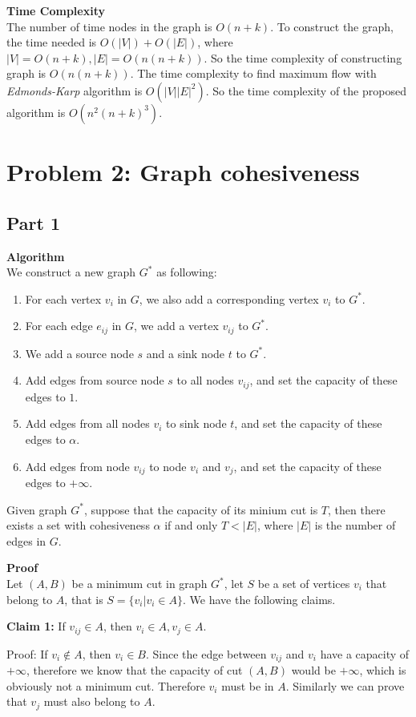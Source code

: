 \documentclass{article}
\newcommand{\Complexity}{\vspace{0.3cm} \noindent\textbf{Time Complexity} \\}
\newcommand{\Proof}{\vspace{0.3cm} \noindent\textbf{Proof} \\}
\newcommand{\Algorithm}{\textbf{Algorithm} \\}
\begin{document}
\Complexity
The number of time nodes in the graph is $O(n+k)$. To construct the graph, the time needed is 
$O(|V|) + O(|E|)$, where $|V| = O(n+k), |E| = O(n(n+k))$. So the time complexity of constructing
graph is $O(n(n+k))$. The time complexity to find maximum flow with \textit{Edmonds-Karp} algorithm
is $O(|V||E|^2)$. So the time complexity of the proposed algorithm is $O(n^2(n+k)^3)$.


\section*{Problem 2: Graph cohesiveness}
\subsection*{Part 1}
\Algorithm
We construct a new graph $G^*$ as following:
\begin{enumerate}
  \item For each vertex $v_i$ in $G$, we also add a corresponding vertex $v_i$ to $G^*$.
  \item For each edge $e_{ij}$ in $G$, we add a vertex $v_{ij}$ to $G^*$.  
  \item We add a source node $s$ and a sink node $t$ to $G^*$.
  \item Add edges from source node $s$ to all nodes $v_{ij}$, and set the capacity of
    these edges to $1$.
  \item Add edges from all nodes $v_i$ to sink node $t$, and set the capacity of these edges to
    $\alpha$.
  \item Add edges from node $v_{ij}$ to node $v_i$ and $v_j$, and set the capacity of these edges
   to $+\infty$.   
\end{enumerate}
Given graph $G^*$, suppose that the capacity of its minium cut is $T$, then there exists a
set with cohesiveness $\alpha$ if and only $T < |E|$, where $|E|$ is the number of edges in $G$. 

\Proof
Let $(A, B)$ be a minimum cut in graph $G^*$, let $S$ be a set of vertices $v_i$ that belong to $A$,
that is $S = \{v_i | v_i \in A \}$. We have the following claims.

\textbf{Claim 1:} If $v_{ij}\in A$, then $v_i \in A, v_j \in A$.

Proof: If $v_i \notin A$, then $v_i \in B$. Since the edge between $v_{ij}$ and $v_i$ have a
capacity of $+\infty$, therefore we know that the capacity of cut $(A, B)$ would be $+\infty$, which
is obviously not a minimum cut. Therefore $v_i$ must be in $A$. Similarly we can prove that $v_j$
must also belong to $A$.   
\end{document}
